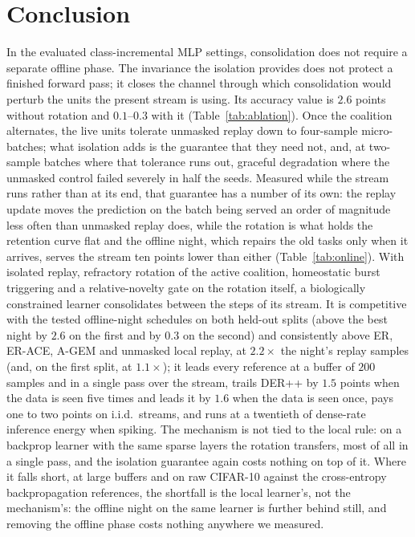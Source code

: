 \documentclass{article}
\begin{document}
\section{Conclusion}

In the evaluated class-incremental MLP settings, consolidation does not require a separate
offline phase. The invariance the isolation provides does not protect a finished forward
pass; it closes the channel through which consolidation would perturb the units the present
stream is using. Its accuracy value is $2.6$ points without rotation and $0.1$--$0.3$ with
it (Table~\ref{tab:ablation}). Once the coalition alternates, the live units tolerate
unmasked replay down to four-sample micro-batches; what isolation adds is the guarantee that
they need not, and, at two-sample batches where that tolerance runs out, graceful
degradation where the unmasked control failed severely in half the seeds. Measured while
the stream runs rather than at its end, that guarantee has a number of its own: the replay
update moves the prediction on the batch being served an order of magnitude less often than
unmasked replay does, while the rotation is what holds the retention curve flat and the
offline night, which repairs the old tasks only when it arrives, serves the stream ten
points lower than either (Table~\ref{tab:online}). With isolated
replay, refractory rotation of the active coalition, homeostatic burst triggering and a
relative-novelty gate on the rotation itself, a biologically constrained learner
consolidates between the steps of its stream. It is competitive with the tested
offline-night schedules on both held-out splits (above the best night by $2.6$ on the first
and by $0.3$ on the second) and consistently above ER, ER-ACE, A-GEM
and unmasked local replay, at $2.2\times$ the night's replay samples (and, on the first
split, at $1.1\times$); it leads every reference at a buffer of $200$ samples and in a
single pass over the stream, trails DER++ by $1.5$ points when the data is seen five times
and leads it by $1.6$ when the data is seen once, pays one to two points on i.i.d.\ streams, and runs at a
twentieth of dense-rate inference energy when spiking. The mechanism is not tied to the
local rule: on a backprop learner with the same sparse layers the rotation transfers, most
of all in a single pass, and the isolation guarantee again costs nothing on top of it. Where
it falls short, at large
buffers and on raw CIFAR-10 against the cross-entropy backpropagation references, the
shortfall is the local learner's, not the mechanism's: the offline night on the same
learner is further behind still, and removing the offline phase costs nothing anywhere we
measured.
\end{document}
